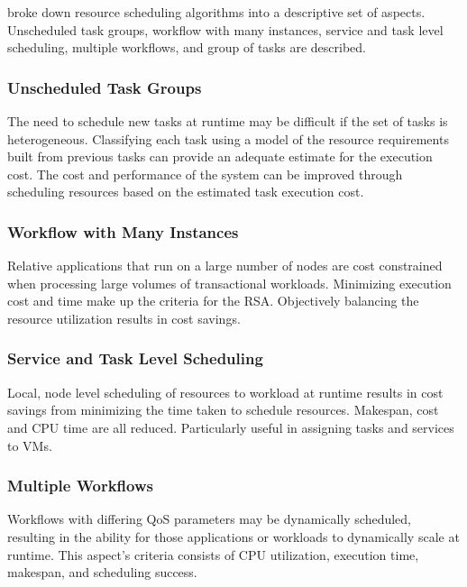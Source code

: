 \documentclass[fullapage,12pt]{article}
\begin{document}
\textcite{Singh2016} broke down resource scheduling algorithms into a descriptive set of aspects. Unscheduled task groups, workflow with many instances, service and task level scheduling, multiple workflows, and group of tasks are described.



\subsubsection*{Unscheduled Task Groups}

The need to schedule new tasks at runtime may be difficult if the set of tasks is heterogeneous. Classifying each task using a model of the resource requirements built from previous tasks can provide an adequate estimate for the execution cost. The cost and performance of the system can be improved through scheduling resources based on the estimated task execution cost.

\subsubsection*{Workflow with Many Instances}

Relative applications that run on a large number of nodes are cost constrained when processing large volumes of transactional workloads. Minimizing execution cost and time make up the criteria for the RSA. Objectively balancing the resource utilization results in cost savings.

\subsubsection*{Service and Task Level Scheduling}

Local, node level scheduling of resources to workload at runtime results in cost savings from minimizing the time taken to schedule resources. Makespan, cost and CPU time are all reduced. Particularly useful in assigning tasks and services to VMs.

\subsubsection*{Multiple Workflows}

Workflows with differing QoS parameters may be dynamically scheduled, resulting in the ability for those applications or workloads to dynamically scale at runtime. This aspect's criteria consists of CPU utilization, execution time, makespan, and scheduling success.
\end{document}
